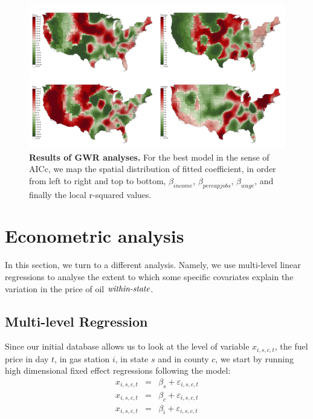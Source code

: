 \documentclass[10pt]{article}
\begin{document}
\begin{figure}
\centering
\includegraphics[width=\linewidth]{Fig6.jpg}

\caption{\textbf{Results of GWR analyses.} For the best model in the sense of AICc, we map the spatial distribution of fitted coefficient, in order from left to right and top to bottom, $\beta_{income}$, $\beta_{percapjobs}$, $\beta_{wage}$, and finally the local r-squared values.}
\label{fig:gwr}
\end{figure}


\section{Econometric analysis}\label{sec:econometry}

In this section, we turn to a different analysis. Namely, we use multi-level linear regressions to analyse the extent to which some specific covariates explain the variation in the price of oil $\emph{within-state}$.

\subsection{Multi-level Regression}

Since our initial database allows us to look at the level of variable $x_{i,s,c,t}$, the fuel price in day $t$, in gas station $i$, in state $s$ and in county $c$, we start by running high dimensional fixed effect regressions following the model:
\begin{eqnarray}
x_{i,s,c,t} &=& \beta_s + \varepsilon_{i,s,c,t} \\
x_{i,s,c,t} &=& \beta_c + \varepsilon_{i,s,c,t} \\
x_{i,s,c,t} &=& \beta_i + \varepsilon_{i,s,c,t}
\end{eqnarray}
\end{document}
